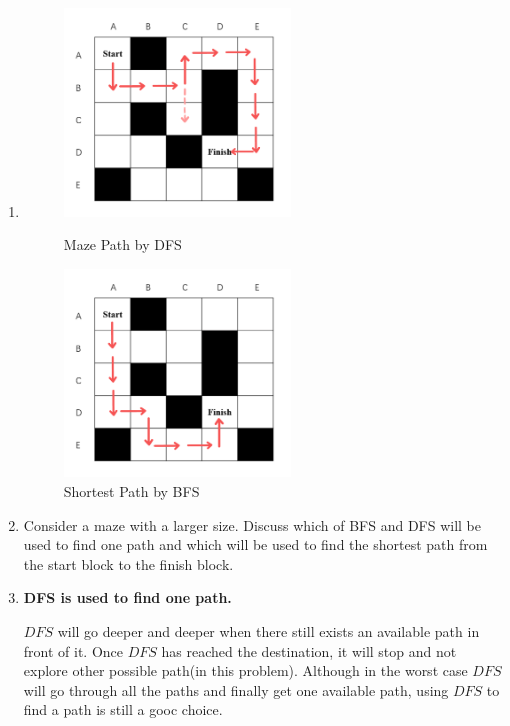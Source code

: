\documentclass[12pt,a4paper]{article}
\makeatletter
\newtheorem*{solution}{Solution}
\theoremstyle{definition}
\renewenvironment{solution}[1][Solution] {\par\pushQED{\qed}\normalfont\topsep6\p@\@plus6\p@\relax\trivlist\item[\hskip\labelsep\bfseries#1\@addpunct{.}]\ignorespaces}{\popQED\endtrivlist\@endpefalse} \makeatother
\makeatother
\begin{document}
\begin{enumerate}
\begin{enumerate}
\begin{solution}
        \begin{figure}[htbp]
            \centering
            \begin{minipage}[t]{0.48\textwidth}
            \centering
            \includegraphics[width=6cm]{maze1.pdf}
            \caption{Maze Path by DFS}\label{maze1}
            \end{minipage}
            \begin{minipage}[t]{0.48\textwidth}
            \centering
            \includegraphics[width=6cm]{maze2.pdf}
            \caption{Shortest Path by BFS}\label{maze2}
            \end{minipage}
            \end{figure}
        \end{solution}
        \item Consider a maze with a larger size. Discuss which of BFS and DFS will be used to find one path and which will be used to find the shortest path from the start block to the finish block.
        \begin{solution}
        \textbf{DFS is used to find one path.} 
        
        $DFS$ will go deeper and deeper when there still exists an available path in front of it. Once $DFS$ has reached the destination, it will stop and not explore other possible path(in this problem). Although in the worst case $DFS$ will go through all the paths and finally get one available path, using $DFS$ to find a path is still a gooc choice.
        

\end{solution}
\end{enumerate}
\end{enumerate}
\end{document}
